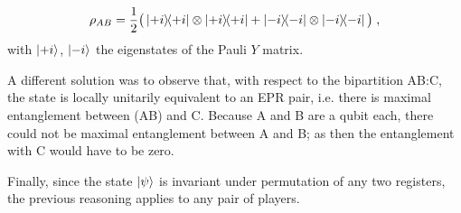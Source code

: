 \documentclass[12pt]{article}
\begin{document}
\begin{enumerate}
\begin{enumerate}
\[ \rho_{AB} = \frac12\big(\proj{+i}\otimes \proj{+i}+\proj{-i}\otimes\proj{-i}\big)\;,\]
with $\ket{+i}$, $\ket{-i}$ the eigenstates of the Pauli $Y$ matrix.  

A different solution was to observe that, with respect to the bipartition AB:C, the state is locally unitarily equivalent to an EPR pair, i.e. there is maximal entanglement between (AB) and C. Because A and B are a qubit each, there could not be maximal entanglement between A and B; as then the entanglement with C would have to be zero. 

Finally, since the state $\ket{\psi}$ is invariant under permutation of any two registers, the previous reasoning applies to any pair of players. 
\end{enumerate}




\end{enumerate}
\end{document}
